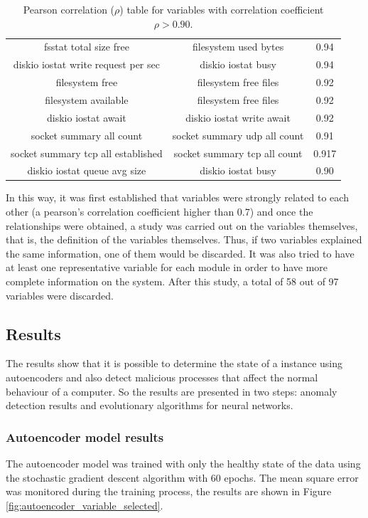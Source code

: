 \documentclass{iosart2c}
\begin{document}
\begin{table}[h!]
\begin{tabular}{ccc}
fsstat total size free & filesystem used bytes & 0.94\\ 
diskio iostat write request per sec & diskio iostat busy & 0.94\\ 
filesystem free & filesystem free files & 0.92\\ 
filesystem available & filesystem free files & 0.92\\ 
diskio iostat await & diskio iostat write await & 0.92\\ 
socket summary all count & socket summary udp all count & 0.91\\ 
socket summary tcp all established & socket summary tcp all count & 0.917\\ 
diskio iostat queue avg size & diskio iostat busy & 0.90\\ \hline

\end{tabular}
\label{tabla:sencilla}
\caption{Pearson correlation ($\rho$) table for variables with correlation coefficient $\rho>0.90$.}
\end{table}

In this way, it was first established that variables were strongly related to each other (a pearson's correlation coefficient higher than 0.7) and once the relationships were obtained, a study was carried out on the variables themselves, that is, the definition of the variables themselves. Thus, if two variables explained the same information, one of them would be discarded. It was also tried to have at least one representative variable for each module in order to have more complete information on the system. After this study, a total of 58 out of 97 variables were discarded.


\subsection{Results}


The results show that it is possible to determine the state of a instance using autoencoders and also detect malicious processes that affect the normal behaviour of a computer. So the results are presented in two steps: anomaly detection results and evolutionary algorithms for neural networks.


\subsubsection{Autoencoder model results}\label{results_autoencoder}

The autoencoder model was trained with only the healthy state of the data using the stochastic gradient descent algorithm with 60 epochs. The mean square error was monitored during the training process, the results are shown in Figure \ref{fig:autoencoder_variable_selected}.\\
\end{document}
